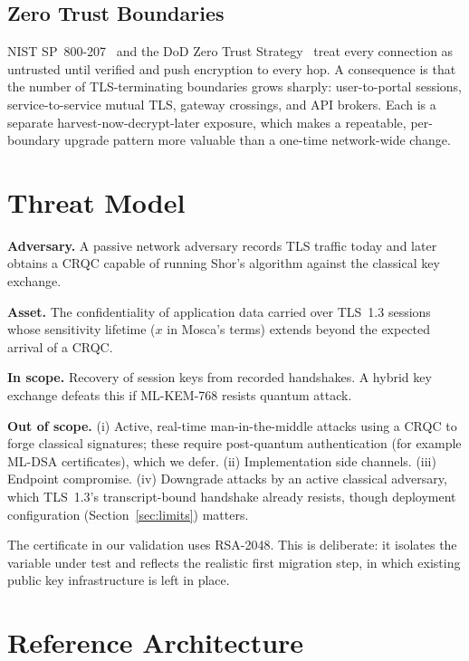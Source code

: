 \documentclass[conference]{IEEEtran}
\begin{document}
\subsection{Zero Trust Boundaries}
NIST SP~800-207~\cite{sp800207} and the DoD Zero Trust Strategy~\cite{dodzt} treat every connection as untrusted until verified and push encryption to every hop. A consequence is that the number of TLS-terminating boundaries grows sharply: user-to-portal sessions, service-to-service mutual TLS, gateway crossings, and API brokers. Each is a separate harvest-now-decrypt-later exposure, which makes a repeatable, per-boundary upgrade pattern more valuable than a one-time network-wide change.

\section{Threat Model}
\label{sec:threat}

\textbf{Adversary.} A passive network adversary records TLS traffic today and later obtains a CRQC capable of running Shor's algorithm against the classical key exchange.

\textbf{Asset.} The confidentiality of application data carried over TLS~1.3 sessions whose sensitivity lifetime ($x$ in Mosca's terms) extends beyond the expected arrival of a CRQC.

\textbf{In scope.} Recovery of session keys from recorded handshakes. A hybrid key exchange defeats this if ML-KEM-768 resists quantum attack.

\textbf{Out of scope.} (i) Active, real-time man-in-the-middle attacks using a CRQC to forge classical signatures; these require post-quantum authentication (for example ML-DSA certificates), which we defer. (ii) Implementation side channels. (iii) Endpoint compromise. (iv) Downgrade attacks by an active classical adversary, which TLS~1.3's transcript-bound handshake already resists, though deployment configuration (Section~\ref{sec:limits}) matters.

The certificate in our validation uses RSA-2048. This is deliberate: it isolates the variable under test and reflects the realistic first migration step, in which existing public key infrastructure is left in place.

\section{Reference Architecture}
\label{sec:arch}
\end{document}

